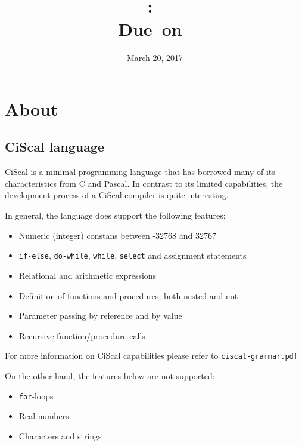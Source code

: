 \documentclass{article}
\title{
\vspace{2in}
\textmd{\textbf{\hmwkClass:\ \hmwkTitle}}\\
\normalsize\vspace{0.1in}\small{Due\ on\ \hmwkDueDate}\\
\vspace{0.1in}\large{\textit{\hmwkClassInstructor}}
\vspace{3in}
}
\author{\textbf{\hmwkAuthorName}}
\date{March 20, 2017} %
\def\code#1{\texttt{#1}} %
\begin{document}
\maketitle


\newpage
\tableofcontents
\newpage


\section{About}

\subsection{CiScal language}
CiScal is a minimal programming language that has borrowed many of its characteristics from C and Pascal.
In contrast to its limited capabilities, the development process of a CiScal compiler is quite interesting.

In general, the language does support the following features:
\begin{itemize}
 \item Numeric (integer) constans between -32768 and 32767
 \item \code{if-else}, \code{do-while}, \code{while}, \code{select} and assignment statements
 \item Relational and arithmetic expressions
 \item Definition of functions and procedures; both nested and not
 \item Parameter passing by reference and by value
 \item Recursive function/procedure calls
\end{itemize}

For more information on CiScal capabilities please refer to \code{ciscal-grammar.pdf}

\vspace{0.5cm}
On the other hand, the features below are not supported:
\begin{itemize}
 \item \code{for}-loops
 \item Real numbers
 \item Characters and strings
\end{itemize}
\end{document}
